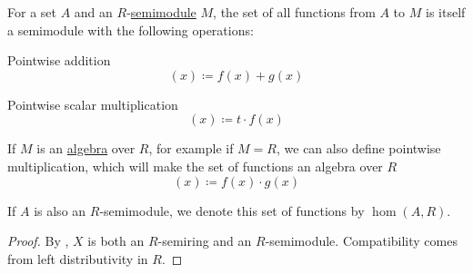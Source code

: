\begin{proposition}\label{thm:functions_over_semimodule}
  For a set \( A \) and an \( R \)-\hyperref[def:semimodule]{semimodule} \( M \), the set of all functions from \( A \) to \( M \) is itself a semimodule with the following operations:
  \begin{thmenum}
     Pointwise addition
    \begin{equation*}
      [f + g](x) \coloneqq f(x) + g(x)
    \end{equation*}

     Pointwise scalar multiplication
    \begin{equation*}
      [t \cdot f](x) \coloneqq t \cdot f(x)
    \end{equation*}

     If \( M \) is an \hyperref[def:algebra_over_semiring]{algebra} over \( R \), for example if \( M = R \), we can also define pointwise multiplication, which will make the set of functions an algebra over \( R \)
    \begin{equation*}
      [f \cdot g](x) \coloneqq f(x) \cdot g(x)
    \end{equation*}
  \end{thmenum}

  If \( A \) is also an \( R \)-semimodule, we denote this set of functions by \( \hom(A, R) \).
\end{proposition}
\begin{proof}
  By , \( X \) is both an \( R \)-semiring and an \( R \)-semimodule. Compatibility comes from left distributivity in \( R \).
\end{proof}
